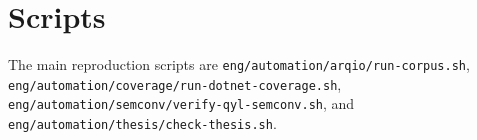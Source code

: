 \chapter{Scripts}

The main reproduction scripts are \texttt{eng/automation/arqio/run-corpus.sh}, \texttt{eng/automation/coverage/run-dotnet-coverage.sh}, \texttt{eng/automation/semconv/verify-qyl-semconv.sh}, and \texttt{eng/automation/thesis/check-thesis.sh}.
